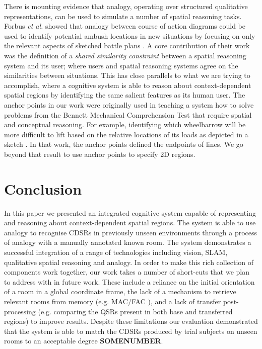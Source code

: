 \documentclass[letterpaper]{article}
\begin{document}
There is mounting evidence that analogy, operating over structured qualitative representations, can be used to simulate a number of spatial reasoning tasks. Forbus \textit{et al.} showed that analogy between course of action diagrams could be used to identify potential ambush locations in new situations by focusing on only the relevant aspects of sketched battle plans \cite{Forbus/etal2003}. A core contribution of their work was the definition of a \textit{shared similarity constraint} between a spatial reasoning system and its user; where users and spatial reasoning systems agree on the similarities between situations. This has close parallels to what we are trying to accomplish, where a cognitive system is able to reason about context-dependent spatial regions by identifying the same salient features as its human user. The anchor points in our work were originally used in teaching a system how to solve problems from the Bennett Mechanical Comprehension Test that require spatial and conceptual reasoning. For example, identifying which wheelbarrow will be more difficult to lift based on the relative locations of its loads as depicted in a sketch \cite{Klenk/etal2005}. In that work, the anchor points defined the endpoints of lines. We go beyond that result to use anchor points to specify 2D regions.  


\section{Conclusion}

In this paper we presented an integrated cognitive system capable of representing and reasoning about context-dependent spatial regions. The system is able to use analogy to recognise CDSRs in previously unseen environments through a process of analogy with a manually annotated known room. The system demonstrates a successful integration of a range of technologies including vision, SLAM, qualitative spatial reasoning and analogy. In order to make this rich collection of components work together, our work takes a number of short-cuts that we plan to address with in future work. These include a reliance on the initial orientation of a room in a global coordinate frame, the lack of a mechanism to retrieve relevant rooms from memory (e.g. MAC/FAC \cite{forbus/etal1995}), and a lack of transfer post-processing (e.g. comparing the QSRs present in both base and transferred regions) to improve results. Despite these limitations our evaluation demonstrated that the system is able to match the CDSRs produced by trial subjects on unseen rooms to an acceptable degree \textbf{SOMENUMBER}.
\end{document}
